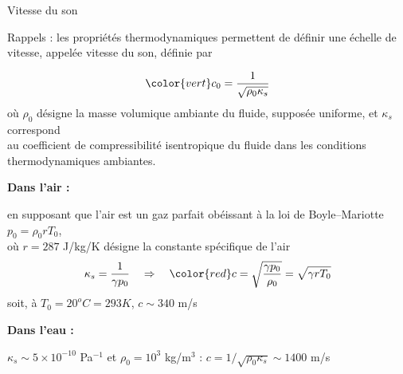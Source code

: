 \begin{frame}{Vitesse du son}

\small


Rappels : les propriétés thermodynamiques permettent de définir une échelle de vitesse, appelée vitesse du son, définie par

\[
	\color{vert}
	c_0 = \dfrac{1}{\sqrt{\rho_0 \kappa_s}}
\]	
où $\rho_0$ désigne la masse volumique ambiante du fluide, supposée uniforme, 
et $\kappa_s$ correspond \\ au coefficient de compressibilité isentropique du fluide
dans les conditions thermodynamiques ambiantes.

\bigskip \pause

\textbf{Dans l'air :}  \medskip

en supposant que l'air est un gaz parfait obéissant à la loi de Boyle--Mariotte 
$p_0 = \rho_0 r T_0$, \\ où $r = 287$ J/kg/K désigne la constante spécifique de l'air
\[
	\kappa_s = \frac{1}{\gamma p_0} 
	\quad \Rightarrow \quad 
	\color{red} c = \sqrt{\dfrac{\gamma p_0}{\rho_0}} = \sqrt{\gamma r T_0}
\]
soit, à $T_0 = 20 ^o  C  = 293 K$, {\color{vert} $c \sim 340$ m/s}

\bigskip \pause

\textbf{Dans l'eau :} \medskip

$\kappa_s \sim 5 \times 10^{-10}$ Pa$^{-1}$ et $\rho_0 = 10^3$ kg/m$^3$ : 
{\color{vert} $c = 1/\sqrt{\rho_0 \kappa_s} \sim 1400$ m/s}

\vspace{0mm}

\end{frame}


